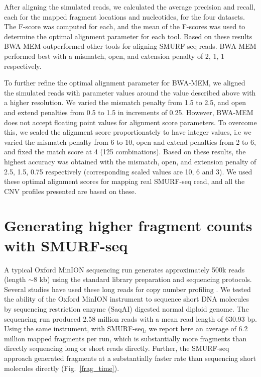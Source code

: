 After aligning the simulated reads, we calculated the average precision
and recall, each for the mapped fragment locations and nucleotides, for
the four datasets. The F-score was computed for each, and the mean of
the F-scores was used to determine the optimal alignment parameter for
each tool. Based on these results BWA-MEM outperformed other tools for
aligning SMURF-seq reads. BWA-MEM performed best with a mismatch, open,
and extension penalty of 2, 1, 1 respectively.

To further refine the optimal alignment parameter for BWA-MEM, we
aligned the simulated reads with parameter values around the value
described above with a higher resolution. We varied the mismatch penalty
from 1.5 to 2.5, and open and extend penalties from 0.5 to 1.5 in
increments of 0.25.
%
However, BWA-MEM does not accept floating point values for alignment
score parameters. To overcome this, we scaled the alignment score
proportionately to have integer values, i.e we varied the mismatch
penalty from 6 to 10, open and extend penalties from 2 to 6, and fixed
the match score at 4 (125 combinations).
%
Based on these results, the highest accuracy was obtained with the
mismatch, open, and extension penalty of 2.5, 1.5, 0.75 respectively
(corresponding scaled values are 10, 6 and 3). We used these optimal
alignment scores for mapping real SMURF-seq read, and all the CNV
profiles presented are based on these.


\section{Generating higher fragment counts with SMURF-seq}
A typical Oxford MinION sequencing run generates approximately 500k
reads (length $\sim$8 kb) \citep{jain2018nanopore,tyson2018minion} using
the standard library preparation and sequencing protocols. Several
studies have used these long reads for copy number profiling
\citep{euskirchen2017same,magi2019nano}.
We tested the ability of the Oxford MinION instrument to sequence short
DNA molecules by sequencing restriction enzyme (SaqAI) digested normal
diploid genome.  The sequencing run produced 2.58 million reads with a
mean read length of 630.93 bp.
Using the same instrument, with SMURF-seq, we report here an average of
6.2 million mapped fragments per run, which is substantially more
fragments than directly sequencing long or short reads directly.
Further, the SMURF-seq approach generated fragments at a substantially
faster rate than sequencing short molecules directly
(Fig.~\ref{frag_time}).

